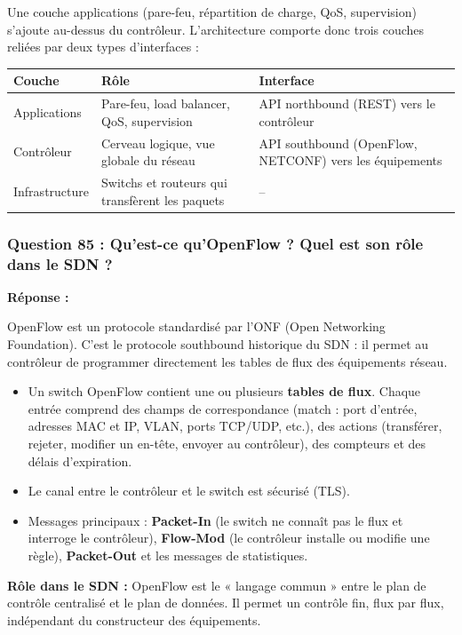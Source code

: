 \documentclass[12pt,a4paper]{article}
\newcommand{\reponse}{\textbf{Réponse :}\par}
\begin{document}
Une couche applications (pare-feu, répartition de charge, QoS,
supervision) s'ajoute au-dessus du contrôleur. L'architecture comporte
donc trois couches reliées par deux types d'interfaces :

\begin{longtable}{|L{3cm}|L{5.8cm}|L{5.8cm}|}
\hline
\textbf{Couche} & \textbf{Rôle} & \textbf{Interface} \\ \hline
Applications & Pare-feu, load balancer, QoS, supervision & API
northbound (REST) vers le contrôleur \\ \hline
Contrôleur & Cerveau logique, vue globale du réseau & API southbound
(OpenFlow, NETCONF) vers les équipements \\ \hline
Infrastructure & Switchs et routeurs qui transfèrent les paquets & -- \\
\hline
\end{longtable}





\subsubsection*{Question 85 : Qu'est-ce qu'OpenFlow ? Quel est son rôle dans le SDN ?}

\reponse
OpenFlow est un protocole standardisé par l'ONF (Open Networking
Foundation). C'est le protocole southbound historique du SDN : il permet
au contrôleur de programmer directement les tables de flux des
équipements réseau.

\begin{itemize}
    \item Un switch OpenFlow contient une ou plusieurs \textbf{tables de
    flux}. Chaque entrée comprend des champs de correspondance (match :
    port d'entrée, adresses MAC et IP, VLAN, ports TCP/UDP, etc.), des
    actions (transférer, rejeter, modifier un en-tête, envoyer au
    contrôleur), des compteurs et des délais d'expiration.
    \item Le canal entre le contrôleur et le switch est sécurisé (TLS).
    \item Messages principaux : \textbf{Packet-In} (le switch ne connaît
    pas le flux et interroge le contrôleur), \textbf{Flow-Mod} (le
    contrôleur installe ou modifie une règle), \textbf{Packet-Out} et les
    messages de statistiques.
\end{itemize}

\textbf{Rôle dans le SDN :} OpenFlow est le « langage commun » entre le
plan de contrôle centralisé et le plan de données. Il permet un contrôle
fin, flux par flux, indépendant du constructeur des équipements.
\end{document}
